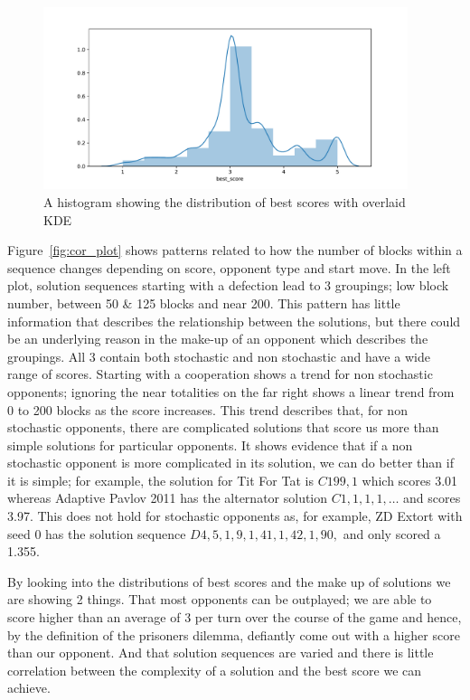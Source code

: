 \begin{figure}[ht]
    \includegraphics[width=0.95\textwidth, center]{./img/descriptive/best_score_hist.pdf}
    \caption{A histogram showing the distribution of best scores with overlaid KDE}\label{fig:best_score_hist}
\end{figure}

Figure~\ref{fig:cor_plot} shows patterns related to how the number of blocks within a sequence changes depending on score, opponent type and start move.
In the left plot, solution sequences starting with a defection lead to 3 groupings; low block number, between 50 \& 125 blocks and near 200.
This pattern has little information that describes the relationship between the solutions, but there could be an underlying reason in the make-up of an opponent which describes the groupings.
All 3 contain both stochastic and non stochastic and have a wide range of scores.
Starting with a cooperation shows a trend for non stochastic opponents; ignoring the near totalities on the far right shows a linear trend from 0 to 200 blocks as the score increases.
This trend describes that, for non stochastic opponents, there are complicated solutions that score us more than simple solutions for particular opponents.
It shows evidence that if a non stochastic opponent is more complicated in its solution, we can do better than if it is simple; for example, the solution for Tit For Tat is $C199,1$ which scores 3.01 whereas Adaptive Pavlov 2011 has the alternator solution $C1,1,1,1,\ldots$ and scores 3.97.
This does not hold for stochastic opponents as, for example, ZD Extort with seed 0 has the solution sequence $D4,5,1,9,1,41,1,42,1,90,$ and only scored a 1.355.

By looking into the distributions of best scores and the make up of solutions we are showing 2 things.
That most opponents can be outplayed; we are able to score higher than an average of 3 per turn over the course of the game and hence, by the definition of the prisoners dilemma, defiantly come out with a higher score than our opponent.
And that solution sequences are varied and there is little correlation between the complexity of a solution and the best score we can achieve. 

